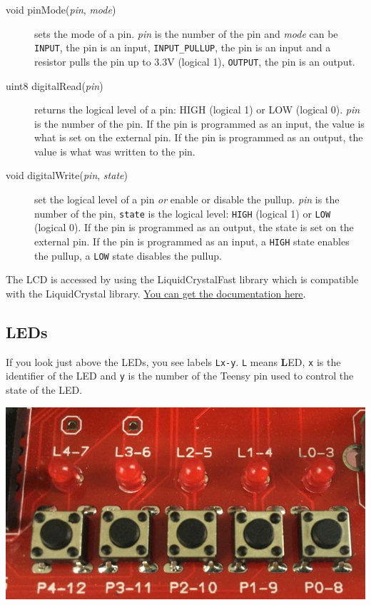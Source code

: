 \documentclass[11pt]{report}
\begin{document}
\begin{description}

\item[void pinMode({\it pin}, {\it mode})] sets the mode of a pin. {\it pin} is the number of the pin and {\it mode} can be {\tt INPUT}, the pin is an input, {\tt INPUT_PULLUP}, the pin is an input and a resistor pulls the pin up to 3.3V (logical 1), {\tt OUTPUT}, the pin is an output.

\item[uint8 digitalRead({\it pin})] returns the logical level of a pin: HIGH (logical 1) or LOW (logical 0). {\it pin} is the number of the pin. If the pin is programmed as an input, the value is what is set on the external pin. If the pin is programmed as an output, the value is what was written to the pin.

\item[void digitalWrite({\it pin}, {\it state})] set the logical level of a pin \emph{or} enable or disable the pullup. {\it pin} is the number of the pin, {\tt state} is the logical level:  {\tt HIGH} (logical 1) or {\tt LOW} (logical 0). If the pin is programmed as an output, the state is set on the external pin. If the pin is programmed as an input, a {\tt HIGH} state enables the pullup, a {\tt LOW} state disables the pullup.

\end{description}

The LCD is accessed by using the LiquidCrystalFast library which is compatible with the LiquidCrystal library. \href{https://www.arduino.cc/en/Reference/LiquidCrystal}{You can get the documentation here}.

\subsection{LEDs}

If you look just above the LEDs, you see labels {\tt Lx-y}. {\tt L} means {\bf L}ED, {\tt x} is the identifier of the LED and {\tt y} is the number of the Teensy pin  used to control the state of the LED.

\begin{center}
\noindent\includegraphics[scale=0.35]{ledsbuttons.jpg}
\end{center}
\end{document}
